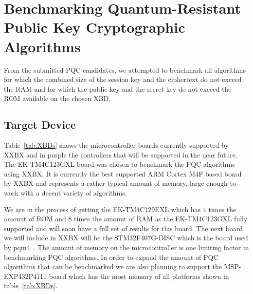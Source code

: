 \documentclass[10pt]{article}
\begin{document}
\section{Benchmarking Quantum-Resistant Public Key Cryptographic Algorithms}

From the submitted PQC candidates, we attempted to benchmark all algorithms for which the
combined size of the session key and the ciphertext do not exceed the RAM and for which the
public key and the secret key do not exceed the ROM available on the chosen XBD.

\subsection{Target Device}

Table~\ref{tab:XBDs} shows the microcontroller boards currently supported by XXBX and in 
{\color{purple}purple} the controllers that will be supported in the near future. 
The EK-TM4C123GXL board was chosen to benchmark the PQC algorithms using XXBX. 
It is currently the best supported ARM Cortex M4F based board by XXBX and represents a 
rather typical amount of memory, large enough to 
work with a decent variety of algorithms. 

We are in the process of getting the EK-TM4C129EXL which has 4 times the amount of
ROM and 8 times the amount of RAM as the EK-TM4C123GXL fully supported and will soon
have a full set of results for this board. 
The next board we will include in XXBX will be the 
STM32F407G-DISC which is the board used by pqm4~\cite{PQM4}.
The amount of memory on the microcontroller is one limiting factor in benchmarking
PQC algorithms. In order to expand the amount of PQC algorithms that can be 
benchmarked we are also planning to support the MSP-EXP432P4111 board which has 
the most memory of all platforms shown in table~\ref{tab:XBDs}.
\end{document}
